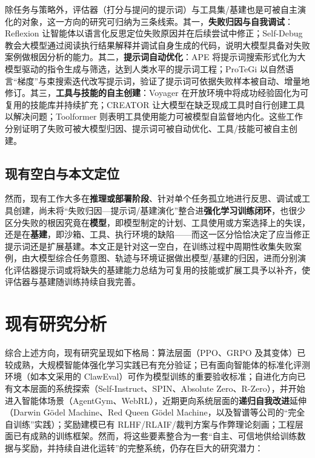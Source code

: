 除任务与策略外，评估器（打分与提问的提示词）与工具集/基建也是可被自主演化的对象，这一方向的研究可归纳为三条线索。其一，\textbf{失败归因与自我调试}：Reflexion 让智能体以语言化反思定位失败原因并在后续尝试中修正；Self-Debug 教会大模型通过阅读执行结果解释并调试自身生成的代码，说明大模型具备对失败案例做根因分析的能力。其二，\textbf{提示词自动优化}：APE 将提示词搜索形式化为大模型驱动的指令生成与筛选，达到人类水平的提示词工程；ProTeGi 以自然语言“梯度”与束搜索迭代改写提示词，验证了提示词可依据失败样本被自动、增量地修订。其三，\textbf{工具与技能的自主创建}：Voyager 在开放环境中将成功经验固化为可复用的技能库并持续扩充；CREATOR 让大模型在缺乏现成工具时自行创建工具以解决问题；Toolformer 则表明工具使用能力可被模型自监督地内化。这些工作分别证明了失败可被大模型归因、提示词可被自动优化、工具/技能可被自主创建。

\subsection{现有空白与本文定位}

然而，现有工作大多在\textbf{推理或部署阶段}、针对单个任务孤立地进行反思、调试或工具创建，尚未将“失败归因—提示词/基建演化”整合进\textbf{强化学习训练闭环}，也很少区分失败的根因究竟在\textbf{模型}，即模型制定的计划、工具使用或方案选择上的失误，还是在\textbf{基建}，即沙箱、工具、执行环境的缺陷——而这一区分恰恰决定了应当修正提示词还是扩展基建。本文正是针对这一空白，在训练过程中周期性收集失败案例，由大模型综合任务意图、轨迹与环境证据做出模型/基建的归因，进而分别演化评估器提示词或将缺失的基建能力总结为可复用的技能或扩展工具予以补齐，使评估器与基建随训练持续自我完善。

\section{现有研究分析}

综合上述方向，现有研究呈现如下格局：算法层面（PPO、GRPO 及其变体）已较成熟，大规模智能体强化学习实践已有充分验证；已有面向智能体的标准化评测环境（如本文采用的 ClawEval）可作为模型训练的重要验收标准；自进化方向已有文本层面的系统探索（Self-Instruct、SPIN、Absolute Zero、R-Zero），并开始进入智能体场景（AgentGym、WebRL），近期更向系统层面的\textbf{递归自我改进}延伸（Darwin Gödel Machine、Red Queen Gödel Machine，以及智谱等公司的“完全自训练”实践）；奖励建模已有 RLHF/RLAIF/裁判方案与作弊理论刻画；工程层面已有成熟的训练框架。然而，将这些要素整合为一套“自主、可信地供给训练数据与奖励，并持续自进化运转”的完整系统，仍存在巨大的研究潜力：

